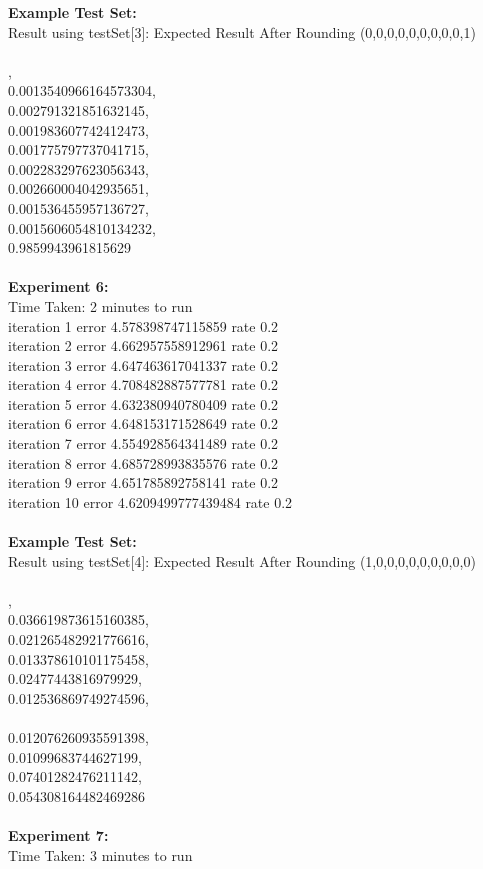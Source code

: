 \documentclass[11pt]{article}
\begin{document}
\begin{page}
\noindent \textbf{Example Test Set:}\\
Result using testSet[3]: Expected Result After Rounding (0,0,0,0,0,0,0,0,0,1)\\\\

,\\
  0.0013540966164573304,\\
  0.002791321851632145,\\
  0.001983607742412473,\\
  0.001775797737041715,\\
  0.002283297623056343,\\
  0.002660004042935651,\\
  0.001536455957136727,\\
  0.0015606054810134232,\\
  0.9859943961815629\\
\\
\noindent \textbf{Experiment 6:} \\
Time Taken: 2 minutes to run\\

\noindent iteration 1 error 4.578398747115859 rate 0.2\\
iteration 2 error 4.662957558912961 rate 0.2\\
iteration 3 error 4.647463617041337 rate 0.2\\
iteration 4 error 4.708482887577781 rate 0.2\\
iteration 5 error 4.632380940780409 rate 0.2\\
iteration 6 error 4.648153171528649 rate 0.2\\
iteration 7 error 4.554928564341489 rate 0.2\\
iteration 8 error 4.685728993835576 rate 0.2\\
iteration 9 error 4.651785892758141 rate 0.2\\
iteration 10 error 4.6209499777439484 rate 0.2\\\\

\noindent \textbf{Example Test Set:}\\
Result using testSet[4]: Expected Result After Rounding (1,0,0,0,0,0,0,0,0,0)\\\\

,\\
  0.036619873615160385,\\
  0.021265482921776616,\\
  0.013378610101175458,\\
  0.02477443816979929,\\
  0.012536869749274596,\\\\
  0.012076260935591398,\\
  0.01099683744627199,\\
  0.07401282476211142,\\
  0.054308164482469286\\
\\
\noindent \textbf{Experiment 7:} \\
Time Taken: 3 minutes to run\\


\end{page}
\end{document}
